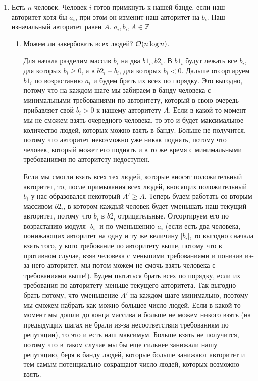 \begin{enumerate}
  \item
	Есть $n$ человек. Человек $i$ готов примкнуть к нашей банде, если наш авторитет
	хотя бы $a_i$, при этом он изменит наш авторитет на $b_i$. Наш изначальный авторитет
	равен $A$. $a_i, b_i, A \in \mathbb{Z}$
	\begin{enumerate}
		\item Можем ли завербовать всех людей? $\mathcal{O}(n \log n)$.
		
        \begin{solution}
            Для начала разделим массив $b_i$ на два $b1_i, b2_i$. В $b1_i$ будут лежать все $b_i$, для которых $b_i \geq 0$, а в $b2_i$ -- $b_i$, для которых $b_i < 0$. Дальше отсортируем $b1_i$ по возрастанию $a_i$ и будем брать их всех по порядку. Это выгодно, потому что на каждом шаге мы забираем в банду человека с минимальными требованиями по авторитету, который в свою очередь прибавляет свой $b_i > 0$ к нашему авторитету $A$. Если в какой-то момент мы не сможем взять очередного человека, то это и будет максимальное количество людей, которых можно взять в банду. Больше не получится, потому что авторитет невозможно уже никак поднять, потому что человек, который может его поднять и в то же время с минимальными требованиями по авторитету недоступен.

            Если мы смогли взять всех тех людей, которые вносят положительный авторитет, то, после примыкания всех людей, вносящих положительный $b_i$ у нас образовался некоторый $A' \geq A$. Теперь будем работать со вторым массивом $b2_i$, в котором каждый человек будет уменьшать наш текущий авторитет, потому что $b_i$ в $b2_i$ отрицательные. Отсортируем его по возрастанию модуля $|b_i|$ и по уменьшению $a_i$ (если есть два человека, понижающих авторитет на одну и ту же величину $|b_i|$, то выгодно сначала взять того, у кого требование по авторитету выше, потому что в противном случае, взяв человека с меньшими требованиями и понизив из-за него авторитет, мы потом можем не смочь взять человека с требованиями выше!). Будем пытаться брать всех по порядку, если их требования по авторитету меньше текущего авторитета. Так выгодно брать потому, что уменьшение $A'$ на каждом шаге минимально, поэтому мы сможем набрать как можно большее число людей. Если в какой-то момент мы дошли до конца массива и больше не можем никого взять (на предыдущих шагах не брали из-за несоответствия требованиям по репутации), то это и есть наш максимум. Больше взять не получится, потому что в таком случае мы бы еще сильнее занижали нашу репутацию, беря в банду людей, которые больше занижают авторитет и тем самым потенциально сокращают число людей, которых возможно взять.


\end{solution}
\end{enumerate}
\end{enumerate}
